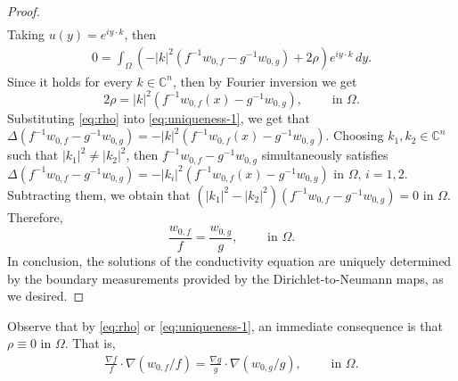 \documentclass[12pt]{article}
\newtheorem{corollary}[theorem]{Corollary}
\def\R{\mathbb{R}}
\begin{document}
\begin{proof}
\begin{align*}
\end{align*}
Taking $u(y)=e^{iy\cdot k}$, then 
\begin{align*}
0=\int_{\Omega} \left(-|k|^2(f^{-1}w_{0,f}-g^{-1}w_{0,g})+2\rho\right)e^{iy \cdot k}\, dy.
\end{align*}
Since it holds for every $k\in \mathbb{C}^n$, then by Fourier inversion we get
\begin{equation}\label{eq:rho}
2\rho=|k|^2(f^{-1}w_{0,f}(x)-g^{-1}w_{0,g}), \qquad \text{ in } \Omega.     
\end{equation}
Substituting \eqref{eq:rho} into \eqref{eq:uniqueness-1}, we get that $\Delta(f^{-1}w_{0,f}-g^{-1}w_{0,g})=-|k|^2(f^{-1}w_{0,f}(x)-g^{-1}w_{0,g})$. Choosing $k_1,k_2\in \mathbb{C}^n$ such that $|k_1|^2\ne |k_2|^2$, then $f^{-1}w_{0,f}-g^{-1}w_{0,g}$ simultaneously satisfies $\Delta(f^{-1}w_{0,f}-g^{-1}w_{0,g})=-|k_i|^2(f^{-1}w_{0,f}(x)-g^{-1}w_{0,g})$ in $\Omega$, $i=1,2$. Subtracting them, we obtain that $(|k_1|^2-|k_2|^2)(f^{-1}w_{0,f}-g^{-1}w_{0,g})=0$ in $\Omega$. Therefore, 
\begin{equation*}
\frac{w_{0,f}}{f}=\frac{w_{0,g}}{g}, \qquad \text{ in }\Omega.
\end{equation*}
In conclusion, the solutions of the conductivity equation are uniquely determined by the boundary measurements provided by the Dirichlet-to-Neumann maps, as we desired.
\end{proof}
Observe that by \eqref{eq:rho} or \eqref{eq:uniqueness-1}, an immediate consequence is that $\rho\equiv 0$ in $\Omega$. That is,
\begin{align}\label{eq:uniqueness-2}
\frac{\nabla f}{f}\cdot \nabla(w_{0,f}/f)=\frac{\nabla g}{g}\cdot \nabla(w_{0,g}/g), \qquad \text{ in }\Omega.
\end{align}
\end{document}
